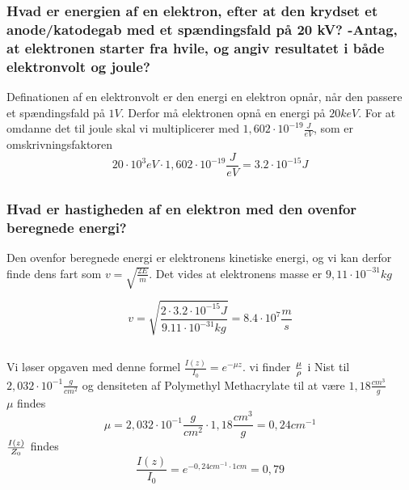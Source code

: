 \documentclass[a4paper,twoside]{article}
\begin{document}
\subsubsection*{Hvad er energien af en elektron, efter at den krydset et anode/katodegab med et spændingsfald på 20 kV? -Antag, at elektronen starter fra hvile, og angiv resultatet i
både elektronvolt og joule?}
Definationen af en elektronvolt er den energi en elektron opnår, når den passere et spændingsfald på $1V$. Derfor må elektronen opnå en energi på $20keV$. For at omdanne det til joule skal vi multiplicerer med $1,602\cdot10^{-19} \frac{J}{eV}$, som er omskrivningsfaktoren
\begin{equation*}
20\cdot10^3 eV \cdot1,602\cdot10^{-19} \frac{J}{eV}=3.2\cdot10^{-15} J
\end {equation*}

\subsection{}
\subsubsection*{Hvad er hastigheden af en elektron med den ovenfor beregnede energi?}
Den ovenfor beregnede energi er elektronens kinetiske energi, og vi kan derfor finde dens fart som $v=\sqrt{\frac{2E}{m}}$.
Det vides at elektronens masse er $9,11\cdot10^{-31} kg$

\begin {equation*}
v=\sqrt{\frac{2\cdot3.2\cdot10^{-15}J}{9.11\cdot10^{-31}kg}}=8.4\cdot10^7 \frac{m}{s}
\end{equation*}
\subsection{}
\subsection{}
Vi løser opgaven med denne formel $\frac{I(z)}{I_0}=e^{-\mu z}$. vi finder $\mu\over\rho$ i Nist til $2,032\cdot 10^{-1} \frac{g}{cm^2}$ og densiteten af Polymethyl Methacrylate til at være $1,18\frac{cm^3}{g}$\\
$\mu$ findes
\begin{equation*}
    \mu=2,032\cdot10^{-1}\frac{g}{cm^2}\cdot1,18\frac{cm^3}{g}=0,24cm^{-1}
\end{equation*}
$I(z)\over Z_0$ findes
\begin{equation*}
    \frac{I(z)}{I_0}=e^{-0,24cm^{-1}\cdot 1cm}=0,79
\end{equation*}
 
\end{document}
